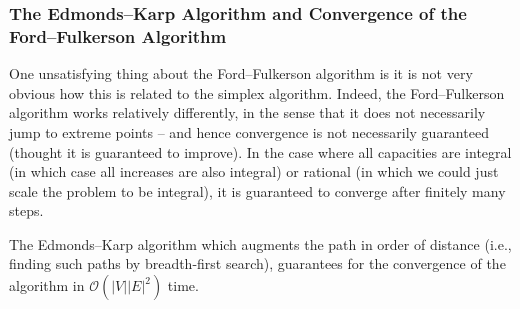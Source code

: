 \documentclass[11pt]{article}
\theoremstyle{definition}
\theoremstyle{remark}
\newcommand{\pqty}[1]{\left(#1\right)}
\newcommand{\abs}[1]{\left|#1\right|}
\newcommand{\bigO}{\mathcal{O}}
\begin{document}
\subsubsection{The Edmonds--Karp Algorithm and Convergence of the Ford--Fulkerson Algorithm}

One unsatisfying thing about the Ford--Fulkerson algorithm is it is not very obvious how this is related to the simplex algorithm. Indeed, the Ford--Fulkerson algorithm works relatively differently, in the sense that it does not necessarily jump to extreme points -- and hence convergence is not necessarily guaranteed (thought it is guaranteed to improve). In the case where all capacities are integral (in which case all increases are also integral) or rational (in which we could just scale the problem to be integral), it is guaranteed to converge after finitely many steps.

The Edmonds--Karp algorithm which augments the path in order of distance (i.e., finding such paths by breadth-first search), guarantees for the convergence of the algorithm in \(\bigO\pqty{\abs{V} \abs{E}^2}\) time.
\end{document}
